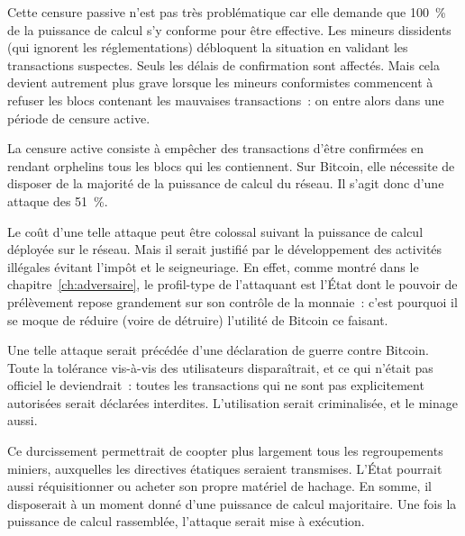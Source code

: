 Cette censure passive n'est pas très problématique car elle demande que 100~\% de la puissance de calcul s'y conforme pour être effective. Les mineurs dissidents (qui ignorent les réglementations) débloquent la situation en validant les transactions suspectes. Seuls les délais de confirmation sont affectés. Mais cela devient autrement plus grave lorsque les mineurs conformistes commencent à refuser les blocs contenant les mauvaises transactions~: on entre alors dans une période de censure active.

La censure active consiste à empêcher des transactions d'être confirmées en rendant orphelins tous les blocs qui les contiennent. Sur Bitcoin, elle nécessite de disposer de la majorité de la puissance de calcul du réseau. Il s'agit donc d'une attaque des 51~\%.

Le coût d'une telle attaque peut être colossal suivant la puissance de calcul déployée sur le réseau. Mais il serait justifié par le développement des activités illégales évitant l'impôt et le seigneuriage. En effet, comme montré dans le chapitre~\ref{ch:adversaire}, le profil-type de l'attaquant est l'État dont le pouvoir de prélèvement repose grandement sur son contrôle de la monnaie~: c'est pourquoi il se moque de réduire (voire de détruire) l'utilité de Bitcoin ce faisant.

Une telle attaque serait précédée d'une déclaration de guerre contre Bitcoin. Toute la tolérance vis-à-vis des utilisateurs disparaîtrait, et ce qui n'était pas officiel le deviendrait~: toutes les transactions qui ne sont pas explicitement autorisées serait déclarées interdites. L'utilisation serait criminalisée, et le minage aussi.


Ce durcissement permettrait de coopter plus largement tous les regroupements miniers, auxquelles les directives étatiques seraient transmises. L'État pourrait aussi réquisitionner ou acheter son propre matériel de hachage. En somme, il disposerait à un moment donné d'une puissance de calcul majoritaire. Une fois la puissance de calcul rassemblée, l'attaque serait mise à exécution.

